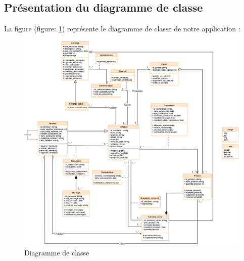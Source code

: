 \documentclass[edit,12pt,a4paper,ChapStyle,oneside,doubleinterligne]{report}
\begin{document}
\subsection{Présentation du diagramme de classe}
La figure (figure: \ref{fig:diag_class}) représente le diagramme de classe de notre application :
\begin{figure}[h!]
\centering
\includegraphics[width=1\textwidth]{images/diagramme de class.png}
\caption{Diagramme de classe}
\label{fig:diag_class}
\end{figure}
\end{document}
